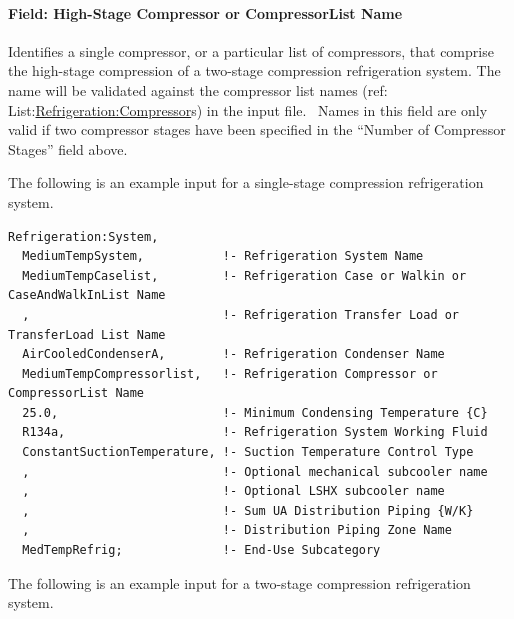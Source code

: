 \paragraph{Field: High-Stage Compressor or CompressorList Name}\label{field-high-stage-compressor-or-compressorlist-name}

Identifies a single compressor, or a particular list of compressors, that comprise the high-stage compression of a two-stage compression refrigeration system. The name will be validated against the compressor list names (ref: List:\hyperref[refrigerationcompressor]{Refrigeration:Compressor}s) in the input file.~ Names in this field are only valid if two compressor stages have been specified in the ``Number of Compressor Stages'' field above.

The following is an example input for a single-stage compression refrigeration system.

\begin{lstlisting}
Refrigeration:System,
  MediumTempSystem,           !- Refrigeration System Name
  MediumTempCaselist,         !- Refrigeration Case or Walkin or CaseAndWalkInList Name
  ,                           !- Refrigeration Transfer Load or TransferLoad List Name
  AirCooledCondenserA,        !- Refrigeration Condenser Name
  MediumTempCompressorlist,   !- Refrigeration Compressor or CompressorList Name
  25.0,                       !- Minimum Condensing Temperature {C}
  R134a,                      !- Refrigeration System Working Fluid
  ConstantSuctionTemperature, !- Suction Temperature Control Type
  ,                           !- Optional mechanical subcooler name
  ,                           !- Optional LSHX subcooler name
  ,                           !- Sum UA Distribution Piping {W/K}
  ,                           !- Distribution Piping Zone Name
  MedTempRefrig;              !- End-Use Subcategory
\end{lstlisting}

The following is an example input for a two-stage compression refrigeration system.

